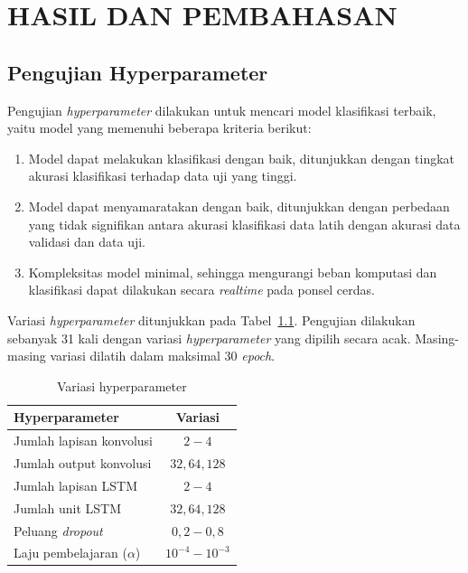 \chapter{HASIL DAN PEMBAHASAN}

\section{Pengujian Hyperparameter}

Pengujian \textit{hyperparameter} dilakukan untuk mencari model klasifikasi terbaik, yaitu model yang memenuhi beberapa kriteria berikut:

\begin{enumerate}
    \item Model dapat melakukan klasifikasi dengan baik, ditunjukkan dengan tingkat akurasi klasifikasi terhadap data uji yang tinggi.
    \item Model dapat menyamaratakan dengan baik, ditunjukkan dengan perbedaan yang tidak signifikan antara akurasi klasifikasi data latih dengan akurasi data validasi dan data uji.
    \item Kompleksitas model minimal, sehingga mengurangi beban komputasi dan klasifikasi dapat dilakukan secara \textit{realtime} pada ponsel cerdas.
\end{enumerate}

Variasi \textit{hyperparameter} ditunjukkan pada Tabel~\ref{table:variasi-hyperparameter}. Pengujian dilakukan sebanyak 31 kali dengan variasi \textit{hyperparameter} yang dipilih secara acak. Masing-masing variasi dilatih dalam maksimal 30 \textit{epoch}.

\begin{table}[h!]
    \centering
    \caption{Variasi hyperparameter}
    \begin{tabular}{ |l|c| }
        \hline
        Hyperparameter & Variasi \\

        \hline
        Jumlah lapisan konvolusi & $2 - 4$ \\

        \hline
        Jumlah output konvolusi & $32, 64, 128$ \\

        \hline
        Jumlah lapisan LSTM & $2 - 4$ \\

        \hline
        Jumlah unit LSTM & $32, 64, 128$ \\

        \hline
        Peluang \textit{dropout} & $0,2 - 0,8$ \\

        \hline
        Laju pembelajaran ($\alpha$) & $10^{-4} - 10^{-3}$ \\

        \hline
    \end{tabular}
    \label{table:variasi-hyperparameter}
\end{table}

